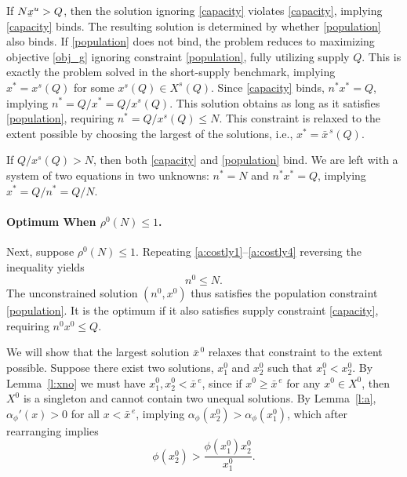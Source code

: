 \documentclass[12pt]{article}
\newcommand{\lowerbar}[1]{\underaccent{\bar}{#1}}
\newcommand{\efficacy}{\phi}
\newcommand{\ratio}{\rho^0\!}
\newcommand{\xunivlbar}{\lowerbar{x}^{u}}
\newcommand{\xshort}{x^{s}}
\newcommand{\Xshort}{X^{s}}
\newcommand{\xshortbar}{\bar{x}^{\,s}}
\newcommand{\xunitbar}{\bar{x}^{\,e}}
\newcommand{\xno}{x^{0}}
\newcommand{\Xno}{X^{0}}
\newcommand{\xnobar}{\bar{x}^{\,0}}
\newcommand{\nno}{n^{0}}
\newcommand{\perunit}[1]{\alpha_{#1}}
\begin{document}
If $N \xunivlbar > Q$, then the solution ignoring \eqref{capacity}
violates \eqref{capacity}, implying \eqref{capacity} binds. The
resulting solution is determined by whether \eqref{population} also
binds. If \eqref{population} does not bind, the problem reduces to
maximizing objective \eqref{obj_g} ignoring constraint
\eqref{population}, fully utilizing supply $Q$. This is exactly the
problem solved in the short-supply benchmark, implying $x^* =
\xshort\!(Q)$ for some $\xshort\!(Q) \in \Xshort\!(Q)$. Since
\eqref{capacity} binds, $n^* x^* = Q$, implying $n^* = Q / x^* = Q /
\xshort\!(Q)$. This solution obtains as long as it satisfies
\eqref{population}, requiring $n^* = Q / \xshort\!(Q) \leq N$. This
constraint is relaxed to the extent possible by choosing the largest
of the solutions, i.e., $x^* = \xshortbar\!(Q)$.

If $Q / \xshort\!(Q) > N$, then both \eqref{capacity} and
\eqref{population} bind. We are left with a system of two equations in
two unknowns: $n^* = N$ and $n^* x^* = Q$, implying $x^* = Q / n^* =
Q/N$.

\paragraph{Optimum When $\ratio(N) \leq 1$.}

Next, suppose $\ratio(N) \leq 1$. Repeating
\eqref{a:costly1}--\eqref{a:costly4} reversing the inequality yields
\begin{equation}
\label{a:nulN}
\nno \leq N.
\end{equation} 
The unconstrained solution $(\nno, \xno)$ thus satisfies the
population constraint \eqref{population}. It is the optimum if it also
satisfies supply constraint \eqref{capacity}, requiring $\nno \xno
\leq Q$.

We will show that the largest solution $\xnobar$ relaxes that
constraint to the extent possible. Suppose there exist two solutions,
$\xno_1$ and $\xno_2$ such that $\xno_1 < \xno_2$. By
Lemma~\ref{l:xno} we must have $\xno_1, \xno_2 < \xunitbar$, since if
$\xno \geq \xunitbar$ for any $\xno \in \Xno$, then $\Xno$ is a
singleton and cannot contain two unequal solutions. By
Lemma~\ref{l:a}, $\perunit{\efficacy}'\!(x) > 0$ for all $x <
\xunitbar$, implying $\perunit{\efficacy}\!(\xno_2) >
\perunit{\efficacy}\!(\xno_1)$, which after rearranging implies
\begin{equation}
\label{a:perunit1vs2}
\efficacy(\xno_2) > \frac{\efficacy(\xno_1) \xno_2}{\xno_1}. 
\end{equation}
\end{document}
